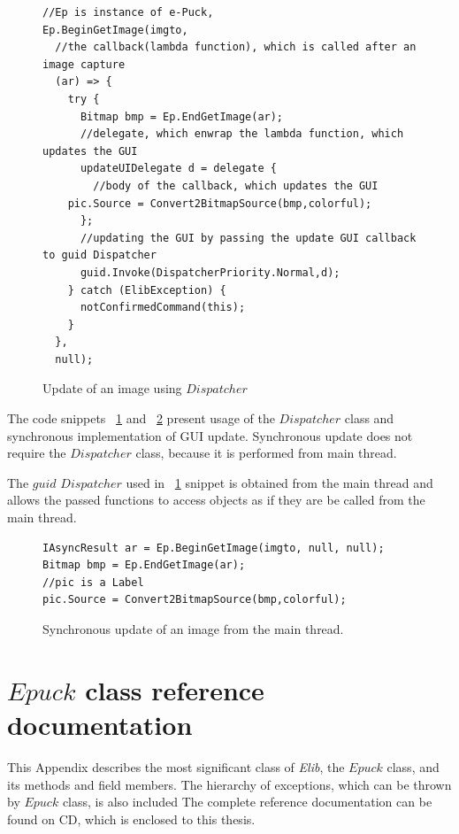 \documentclass[12pt,notitlepage]{report}
\begin{document}
\begin{figure}[!hbp]
\begin{lstlisting}
//Ep is instance of e-Puck,
Ep.BeginGetImage(imgto,
  //the callback(lambda function), which is called after an image capture
  (ar) => {
    try {
      Bitmap bmp = Ep.EndGetImage(ar);
      //delegate, which enwrap the lambda function, which updates the GUI
      updateUIDelegate d = delegate {
      	//body of the callback, which updates the GUI
	pic.Source = Convert2BitmapSource(bmp,colorful);
      };
      //updating the GUI by passing the update GUI callback to guid Dispatcher
      guid.Invoke(DispatcherPriority.Normal,d);
    } catch (ElibException) {
      notConfirmedCommand(this);
    }
  }, 
  null);
\end{lstlisting}
\caption{Update of an image using $Dispatcher$}
\label{updispatcher}
\end{figure}


	The code snippets ~\ref{updispatcher} and ~\ref{upsynchronous} present usage of the $Dispatcher$ class and 
	synchronous implementation of GUI update. Synchronous update does not require the $Dispatcher$ class,
	because it is performed from main thread.

	The $guid$ $Dispatcher$ used in ~\ref{updispatcher} snippet is obtained from the main thread and
	allows the passed functions to access objects as if they are be called from the main thread.

\begin{figure}[!hbp]
\begin{lstlisting}
IAsyncResult ar = Ep.BeginGetImage(imgto, null, null);
Bitmap bmp = Ep.EndGetImage(ar);
//pic is a Label
pic.Source = Convert2BitmapSource(bmp,colorful);
\end{lstlisting}
\caption{Synchronous update of an image from the main thread.}
\label{upsynchronous}
\end{figure}

\chapter{$Epuck$ class reference documentation} \label{app:epuckref}
This Appendix describes the most significant class of {\it Elib}, the $Epuck$ class,
and its methods and field members.
The hierarchy of exceptions, which can be thrown by $Epuck$ class, is also included
The complete reference documentation can be found on CD, which is enclosed
to this thesis.
\end{document}
